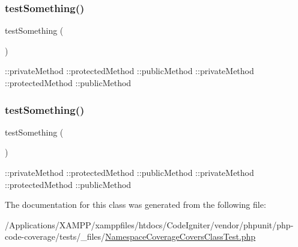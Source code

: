 \subsubsection{\texorpdfstring{test\+Something()}{testSomething()}\hspace{0.1cm}{\footnotesize\ttfamily [1/2]}}
{\footnotesize\ttfamily test\+Something (\begin{DoxyParamCaption}{ }\end{DoxyParamCaption})}

\+::private\+Method  \+::protected\+Method  \+::public\+Method  \+::private\+Method  \+::protected\+Method  \+::public\+Method \mbox{\label{class_namespace_coverage_covers_class_test_a0fc4e17369bc9607ebdd850d9eda8167}} 
\subsubsection{\texorpdfstring{test\+Something()}{testSomething()}\hspace{0.1cm}{\footnotesize\ttfamily [2/2]}}
{\footnotesize\ttfamily test\+Something (\begin{DoxyParamCaption}{ }\end{DoxyParamCaption})}

\+::private\+Method  \+::protected\+Method  \+::public\+Method  \+::private\+Method  \+::protected\+Method  \+::public\+Method 

The documentation for this class was generated from the following file\+:\begin{DoxyCompactItemize}
\item 
/\+Applications/\+X\+A\+M\+P\+P/xamppfiles/htdocs/\+Code\+Igniter/vendor/phpunit/php-\/code-\/coverage/tests/\+\_\+files/\mbox{\hyperlink{php-code-coverage_2tests_2__files_2_namespace_coverage_covers_class_test_8php}{Namespace\+Coverage\+Covers\+Class\+Test.\+php}}\end{DoxyCompactItemize}
